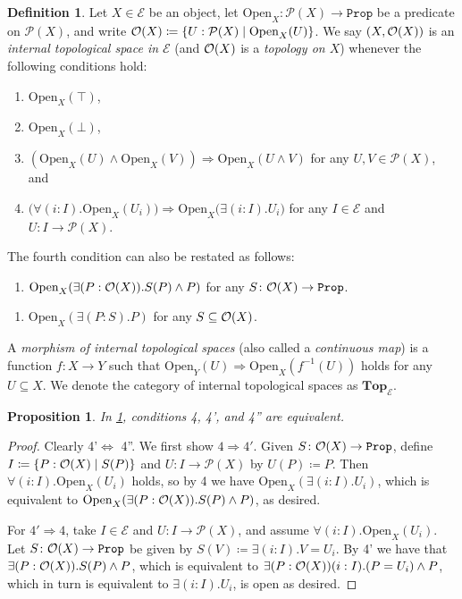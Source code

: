 \documentclass[11pt, oneside, article]{memoir}
\theoremstyle{plain}
\newtheorem{proposition}[theorem]{Proposition}
\theoremstyle{definition}
\newtheorem{definition}[theorem]{Definition}
\theoremstyle{remark}
\renewcommand{\ss}{\subseteq}
\newcommand{\const}[1]{\mathtt{#1}}
\newcommand{\Set}[1]{\mathrm{#1}}
\newcommand{\cat}[1]{\mathcal{#1}}
\newcommand{\Cat}[1]{\mathbf{#1}}
\newcommand{\pow}{\mathcal{P}}
\newcommand{\prop}{\const{Prop}}
\renewcommand{\Top}{\Cat{Top}}
\newcommand{\Op}[1][undef]{\ifthenelse{\equal{#1}{undef}}{\mathcal{O}}{\mathcal{O}(#1)}}
\newcommand{\Open}{\Set{Open}}
\newcommand{\inv}{^{-1}}
\newcommand{\imp}{\Rightarrow}
\renewcommand{\iff}{\Leftrightarrow}
\begin{document}
\begin{definition}\label{def.internal_space}
Let $X\in\cat{E}$ be an object, let $\Open_X\colon\pow(X)\to\prop$ be a predicate on $\pow(X)$, and write $\Op[X]\coloneq\{U:\pow(X)\mid\Open_X(U)\}$. We say $(X,\Op[X])$ is an \emph{internal topological space in $\cat{E}$} (and $\Op[X]$ is a \emph{topology on $X$}) whenever the following conditions hold:
\begin{enumerate}
	\item $\Open_X(\top)$,
	\item $\Open_X(\bot)$,
	\item $(\Open_X(U)\wedge\Open_X(V))\imp \Open_X(U\wedge V)$ for any $U,V\in\pow(X)$, and
	\item $\big(\forall(i:I).\Open_X(U_i)\big)\imp\Open_X\big(\exists(i:I).U_i\big)$ for any $I\in\cat{E}$ and $U\colon I\to\pow(X)$.
\end{enumerate}
The fourth condition can also be restated as follows:
\begin{enumerate}[label=4'.]
	\item $\Open_X(\exists(P:\Op[X]).S(P)\wedge P)$ for any $S\colon\Op[X]\to\prop$. 
\end{enumerate}
\begin{enumerate}[label=4''.]
	\item $\Open_X(\exists(P:S).P)$ for any $S\ss\Op[X]$.
\end{enumerate}

A \emph{morphism of internal topological spaces} (also called a \emph{continuous map}) is a function $f\colon X\to Y$ such that $\Open_Y(U)\imp\Open_X(f\inv(U))$ holds for any $U\ss X$. We denote the category of internal topological spaces as $\Top_\cat{E}$.
\end{definition}

\begin{proposition}
In \cref{def.internal_space}, conditions 4, 4', and 4'' are equivalent.
\end{proposition}
\begin{proof}
Clearly 4'$\iff$ 4''. We first show $4\imp 4'$. Given $S\colon\Op[X]\to\prop$, define $I\coloneqq\{P:\Op[X]\mid S(P)\}$ and $U\colon I\to\pow(X)$ by $U(P)\coloneqq P$. Then $\forall(i:I).\Open_X(U_i)$ holds, so by 4 we have $\Open_X(\exists(i:I).U_i)$, which is equivalent to $\Open_X(\exists(P:\Op[X]).S(P)\wedge P)$, as desired.

For $4'\imp 4$, take $I\in\cat{E}$ and $U\colon I\to\pow(X)$, and assume $\forall(i:I).\Open_X(U_i)$. Let $S\colon\Op[X]\to\prop$ be given by $S(V)\coloneqq\exists(i:I).V=U_i$. By 4' we have that $\exists(P:\Op[X]).S(P)\wedge P$, which is equivalent to $\exists(P:\Op[X])(i:I).(P=U_i)\wedge P$, which in turn is equivalent to $\exists(i:I).U_i$, is open as desired.
\end{proof}
\end{document}

